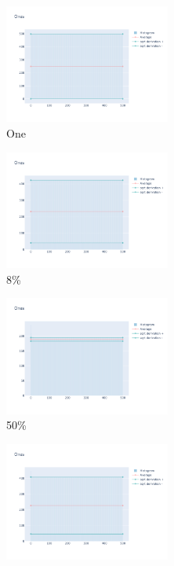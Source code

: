 \documentclass[12pt, fleqn]{report}                             %
\theoremstyle{break}                                            %
\begin{document}
      \begin{figure}[ht!]
        \centering
        \begin{subfigure}[b]{0.4\linewidth}
          \includegraphics[width=0.6\textwidth]{Images/35/dia-a.png}
          \caption{One}
        \end{subfigure}
        \begin{subfigure}[b]{0.4\linewidth}
          \includegraphics[width=0.6\textwidth]{Images/35/dia-b.png}
          \caption{8\%}
        \end{subfigure}
        \begin{subfigure}[b]{0.4\linewidth}
          \includegraphics[width=0.6\textwidth]{Images/35/dia-c.png}
          \caption{50\%}
        \end{subfigure}
        \begin{subfigure}[b]{0.4\linewidth}
          \includegraphics[width=0.6\textwidth]{Images/35/dia-d.png}

\end{subfigure}
\end{figure}
\end{document}
